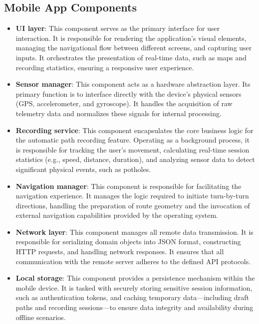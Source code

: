 \subsection{Mobile App Components}

\begin{itemize}
    \item \textbf{UI layer}: This component serves as the primary interface for user interaction. It is responsible for rendering the application's visual elements, managing the navigational flow between different screens, and capturing user inputs. It orchestrates the presentation of real-time data, such as maps and recording statistics, ensuring a responsive user experience.

    \item \textbf{Sensor manager}: This component acts as a hardware abstraction layer. Its primary function is to interface directly with the device's physical sensors (GPS, accelerometer, and gyroscope). It handles the acquisition of raw telemetry data and normalizes these signals for internal processing.

    \item \textbf{Recording service}: This component encapsulates the core business logic for the automatic path recording feature. Operating as a background process, it is responsible for tracking the user's movement, calculating real-time session statistics (e.g., speed, distance, duration), and analyzing sensor data to detect significant physical events, such as potholes.

    \item \textbf{Navigation manager}: This component is responsible for facilitating the navigation experience. It manages the logic required to initiate turn-by-turn directions, handling the preparation of route geometry and the invocation of external navigation capabilities provided by the operating system.

    \item \textbf{Network layer}: This component manages all remote data transmission. It is responsible for serializing domain objects into JSON format, constructing HTTP requests, and handling network responses. It ensures that all communication with the remote server adheres to the defined API protocols.

    \item \textbf{Local storage}: This component provides a persistence mechanism within the mobile device. It is tasked with securely storing sensitive session information, such as authentication tokens, and caching temporary data—including draft paths and recording sessions—to ensure data integrity and availability during offline scenarios.
\end{itemize}

